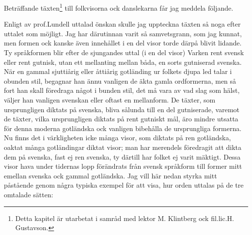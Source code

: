 \fancyhfoffset[E,O]{0pt}
\addtolength{\skip\footins}{\baselineskip}
{


Beträffande täxten\footnote{Detta kapitel är utarbetat i samråd med lektor M. Klintberg ock fil.\@ lic.\@ H. Gustavson.} till folkvisorna ock danslekarna får
jag meddela följande.

\medskip

Enligt av prof.\@ Lundell uttalad önskan skulle jag uppteckna
täxten så noga efter uttalet som möjligt. Jag har
därutinnan varit så samvetsgrann, som jag kunnat, men formen
ock kanske även innehållet i en del visor torde därpå blivit
lidande. Ty språkformen blir efter de sjungandes uttal (i en
del visor) Varken rent svensk eller rent gutnisk, utan ett
mellanting mellan båda, en sorts gutniserad svenska. När
en gammal sjuttiårig eller åttiårig gotländing ur folkets
djupa led talar i obunden stil, begagnar han ännu vanligen
de äkta gamla ordformerna, men så fort han skall föredraga
något i bunden stil, det må vara av vad slag som hälst, väljer
han vanligen svenskan eller oftast en mellanform. De täxter,
som ursprungligen diktats på svenska, bliva sålunda till en
del gutniserade, varemot de täxter, vilka ursprungligen diktats
på rent gutniskt mål, äro mindre utsatta för denna \guillemotright{}moderna\guillemotright{}
gotländska ock vanligen bibehålla de ursprungliga formerna.
Nu finns det i värkligheten icke många visor, som diktats
på ren gotländska, oaktat många gotländingar diktat visor;
man har merendels föredragit att dikta dem på svenska, fast
ej ren svenska, ty därtill har folket ej varit mäktigt.
Dessa visor hava under tidernas lopp förändrats från svensk
språkform till former mitt emellan svenska ock gammal gotländska.
Jag vill här nedan styrka mitt påstående genom några typiska
exempel för att visa, hur orden uttalas på de tre omtalade
sätten:

\bigskip




}
\restoregeometry
\fancyhfoffset[E,O]{0pt}
\pagestyle{main}
